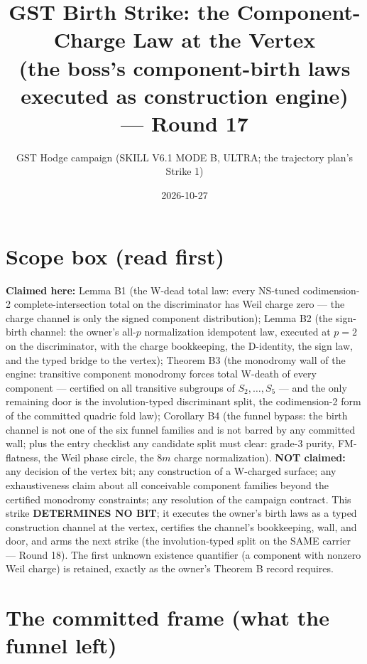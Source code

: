 \documentclass[11pt]{article}
\title{GST Birth Strike: the Component-Charge Law at the Vertex\\
(the boss's component-birth laws executed as construction engine) --- Round 17}
\author{GST Hodge campaign (SKILL V6.1 MODE B, ULTRA; the trajectory plan's Strike 1)}
\date{2026-10-27}
\begin{document}
\maketitle

\section*{Scope box (read first)}

\textbf{Claimed here:} Lemma B1 (the W-dead total law: every NS-tuned
codimension-2 complete-intersection total on the discriminator has Weil charge
zero --- the charge channel is only the signed component distribution); Lemma
B2 (the sign-birth channel: the owner's all-$p$ normalization idempotent law,
executed at $p=2$ on the discriminator, with the charge bookkeeping, the
D-identity, the sign law, and the typed bridge to the vertex); Theorem B3 (the
monodromy wall of the engine: transitive component monodromy forces total
W-death of every component --- certified on all transitive subgroups of
$S_2,\dots,S_5$ --- and the only remaining door is the involution-typed
discriminant split, the codimension-2 form of the committed quadric fold law);
Corollary B4 (the funnel bypass: the birth channel is not one of the six
funnel families and is not barred by any committed wall; plus the entry
checklist any candidate split must clear: grade-3 purity, FM-flatness, the
Weil phase circle, the $8m$ charge normalization). \textbf{NOT claimed:} any
decision of the vertex bit; any construction of a W-charged surface; any
exhaustiveness claim about all conceivable component families beyond the
certified monodromy constraints; any resolution of the campaign contract. This
strike \textbf{DETERMINES NO BIT}; it executes the owner's birth laws as a
typed construction channel at the vertex, certifies the channel's bookkeeping,
wall, and door, and arms the next strike (the involution-typed split on the
SAME carrier --- Round 18). The first unknown existence quantifier (a component
with nonzero Weil charge) is retained, exactly as the owner's Theorem B record
requires.

\section{The committed frame (what the funnel left)}
\end{document}
